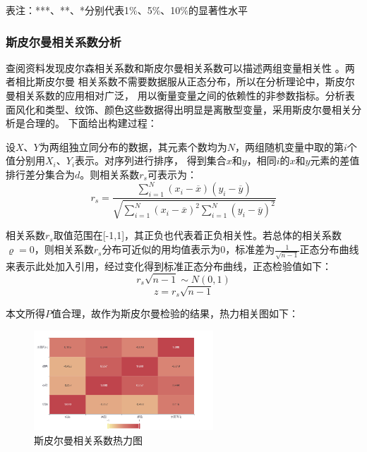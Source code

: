 \documentclass[UTF8]{ctexart}
\begin{document}
                表注：***、**、*分别代表1$\%$、5$\%$、10$\%$的显著性水平
                \subsubsection{斯皮尔曼相关系数分析}
                查阅资料发现皮尔森相关系数和斯皮尔曼相关系数可以描述两组变量相关性\cite{ref2} 。两者相比斯皮尔曼
                相关系数不需要数据服从正态分布，所以在分析理论中，斯皮尔曼相关系数的应用相对广泛，
                用以衡量变量之间的依赖性的非参数指标。分析表面风化和类型、纹饰、颜色这些数据得出明显是离散型变量，采用斯皮尔曼相关分析是合理的。
                下面给出构建过程：

                设$X$、$Y$为两组独立同分布的数据，其元素个数均为$N$，两组随机变量中取的第$i$个值分别用$X_i$、$Y_i$表示。对序列进行排序，
                得到集合$x$和$y$，相同$i$的$x$和$y$元素的差值排行差分集合为$d$。则相关系数$r_s$可表示为：
                \begin{equation}
                    r_s=\frac{\sum_{i=1}^N(x_i-\overline{x})(y_i-\overline{y})}{\sqrt{\sum_{i=1}^N(x_i-\overline{x})^2 \sum_{i=1}^N(y_i-\overline{y})^2} }
                \end{equation}

                相关系数$r_s$取值范围在[-1,1]，其正负也代表着正负相关性。若总体的相关系数$\varrho =0$，则相关系数$r_s$分布可近似的用均值表示为0，标准差为$\frac{1}{\sqrt{n-1} }$正态分布曲线来表示$此处加入引用$，经过变化得到标准正态分布曲线，正态检验值如下：
                \begin{equation}
                    r_s \sqrt{n-1} \sim N(0,1)
                \end{equation}
                \begin{equation}
                    z=r_s \sqrt{n-1}
                \end{equation}

                本文所得$P$值合理，故作为斯皮尔曼检验的结果，热力相关图如下：
                \begin{figure}[H]\centering
                    \includegraphics[width=0.6\textwidth,height=0.4\textwidth]{img/斯皮尔曼相关系数热力图.png} %
                    \caption{斯皮尔曼相关系数热力图} %
                    \label{fig:figure 3} %
                \end{figure}
\end{document}
